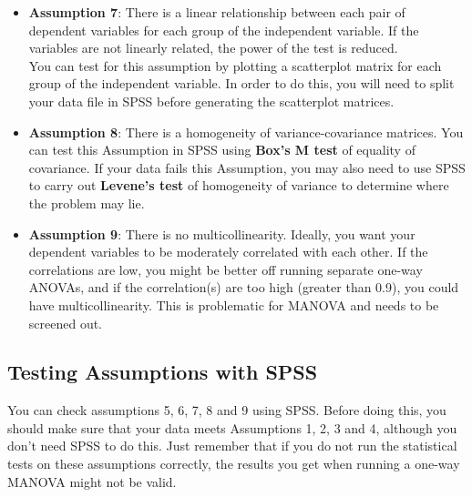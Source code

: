 \documentclass[a4paper,12pt]{article}
\begin{document}
\begin{itemize}
	\item \textbf{Assumption 7}: There is a linear relationship between each pair of dependent variables for each group of the independent variable. If the variables are not linearly related, the power of the test is reduced. \\ You can test for this  assumption by plotting a scatterplot matrix for each group of the independent variable. In order to do this, you will need to split your data file in SPSS before generating the scatterplot matrices.
	\item \textbf{Assumption 8}: There is a homogeneity of variance-covariance matrices. You can test this Assumption in SPSS using \textbf{Box's M test} of equality of covariance. If your data fails this Assumption, you may also need to use SPSS to carry out \textbf{Levene's test} of homogeneity of variance to determine where the problem may lie.
	\item \textbf{Assumption 9}: There is no multicollinearity. Ideally, you want your dependent variables to be moderately correlated with each other. If the correlations are low, you might be better off running separate one-way ANOVAs, and if the correlation(s) are too high (greater than 0.9), you could have multicollinearity. This is problematic for MANOVA and needs to be screened out.
\end{itemize}
\subsection{Testing Assumptions with SPSS}
You can check assumptions 5, 6, 7, 8 and 9 using SPSS. Before doing this, you should make sure that your data meets Assumptions 1, 2, 3 and 4, although you don't need SPSS to do this. Just remember that if you do not run the statistical tests on these assumptions correctly, the results you get when running a one-way MANOVA might not be valid.
\newpage
\end{document}
